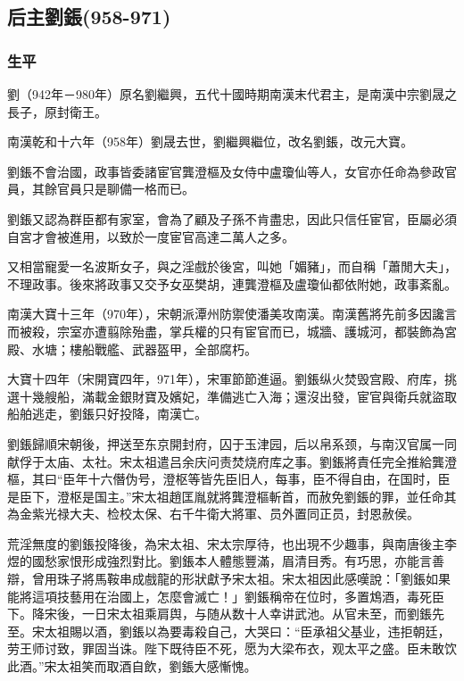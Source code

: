 
\subsection{后主劉鋹\tiny(958-971)}

\subsubsection{生平}

劉（942年－980年）原名劉繼興，五代十國時期南漢末代君主，是南漢中宗劉晟之長子，原封衛王。

南漢乾和十六年（958年）劉晟去世，劉繼興繼位，改名劉鋹，改元大寶。

劉鋹不會治國，政事皆委諸宦官龔澄樞及女侍中盧瓊仙等人，女官亦任命為參政官員，其餘官員只是聊備一格而已。

劉鋹又認為群臣都有家室，會為了顧及子孫不肯盡忠，因此只信任宦官，臣屬必須自宮才會被進用，以致於一度宦官高達二萬人之多。

又相當寵愛一名波斯女子，與之淫戲於後宮，叫她「媚豬」，而自稱「蕭閒大夫」，不理政事。後來將政事又交予女巫樊胡，連龔澄樞及盧瓊仙都依附她，政事紊亂。

南漢大寶十三年（970年），宋朝派潭州防禦使潘美攻南漢。南漢舊將先前多因讒言而被殺，宗室亦遭翦除殆盡，掌兵權的只有宦官而已，城牆、護城河，都裝飾為宮殿、水塘；樓船戰艦、武器盔甲，全部腐朽。

大寶十四年（宋開寶四年，971年），宋軍節節進逼。劉鋹纵火焚毁宫殿、府库，挑選十幾艘船，滿載金銀財寶及嬪妃，準備逃亡入海；還沒出發，宦官與衛兵就盜取船舶逃走，劉鋹只好投降，南漢亡。

劉鋹歸順宋朝後，押送至东京開封府，囚于玉津园，后以帛系颈，与南汉官属一同献俘于太庙、太社。宋太祖遣吕余庆问责焚烧府库之事。劉鋹將責任完全推給龔澄樞，其曰“臣年十六僭伪号，澄枢等皆先臣旧人，每事，臣不得自由，在国时，臣是臣下，澄枢是国主。”宋太祖趙匡胤就將龔澄樞斬首，而赦免劉鋹的罪，並任命其為金紫光禄大夫、检校太保、右千牛衛大將軍、员外置同正员，封恩赦侯。

荒淫無度的劉鋹投降後，為宋太祖、宋太宗厚待，也出現不少趣事，與南唐後主李煜的國愁家恨形成強烈對比。劉鋹本人體態豐滿，眉清目秀。有巧思，亦能言善辯，曾用珠子將馬鞍串成戲龍的形狀獻予宋太祖。宋太祖因此感嘆說：「劉鋹如果能將這項技藝用在治國上，怎麼會滅亡！」劉鋹稱帝在位时，多置鴆酒，毒死臣下。降宋後，一日宋太祖乘肩舆，与随从数十人幸讲武池。从官未至，而劉鋹先至。宋太祖賜以酒，劉鋹以為要毒殺自己，大哭曰：“臣承祖父基业，违拒朝廷，劳王师讨致，罪固当诛。陛下既待臣不死，愿为大梁布衣，观太平之盛。臣未敢饮此酒。”宋太祖笑而取酒自飲，劉鋹大感慚愧。

